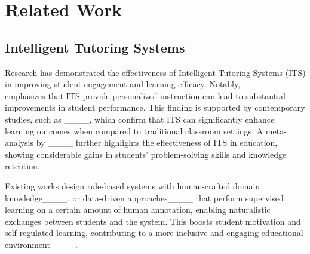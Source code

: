 \section{Related Work}
\subsection{Intelligent Tutoring Systems}
Research has demonstrated the effectiveness of Intelligent Tutoring Systems (ITS) in improving student engagement and learning efficacy. Notably, ____ emphasizes that ITS provide personalized instruction can lead to substantial improvements in student performance. This finding is supported by contemporary studies, such as ____, which confirm that ITS can significantly enhance learning outcomes when compared to traditional classroom settings. A meta-analysis by ____ further highlights the effectiveness of ITS in education, showing considerable gains in students' problem-solving skills and knowledge retention.

Existing works design rule-based systems with human-crafted domain knowledge____, or data-driven approaches____ that perform supervised learning on a certain amount of human annotation, enabling naturalistic exchanges between students and the system. This boosts student motivation and self-regulated learning, contributing to a more inclusive and engaging educational environment____.





